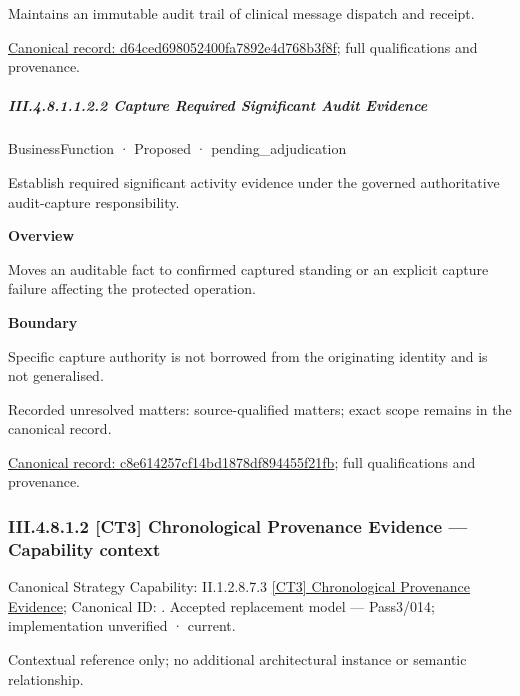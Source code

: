 Maintains an immutable audit trail of clinical message dispatch and receipt.


{\footnotesize \href{../../../../../../../continuum/business/business-function/d64ced698052400fa7892e4d768b3f8f.md}{Canonical record: d64ced698052400fa7892e4d768b3f8f}; full qualifications and provenance.}\par
\subparagraph*{III.4.8.1.1.2.2 Capture Required Significant Audit Evidence}
\label{navigation:III.4.8.1.1.2.2}

\label{element:c8e614257cf14bd1878df894455f21fb}
{\small BusinessFunction · Proposed · pending\_adjudication}\par

Establish required significant activity evidence under the governed authoritative audit-capture responsibility.



\textbf{Overview}



Moves an auditable fact to confirmed captured standing or an explicit capture failure affecting the protected operation.



\textbf{Boundary}



Specific capture authority is not borrowed from the originating identity and is not generalised.


{\small Recorded unresolved matters: source-qualified matters; exact scope remains in the canonical record.}\par
{\footnotesize \href{../../../../../../../continuum/business/business-function/c8e614257cf14bd1878df894455f21fb.md}{Canonical record: c8e614257cf14bd1878df894455f21fb}; full qualifications and provenance.}\par
\subsubsection*{III.4.8.1.2 [CT3] Chronological Provenance Evidence — Capability context}
\label{navigation:III.4.8.1.2}

{\small Canonical Strategy Capability: II.1.2.8.7.3 \hyperref[element:95c06dba5448453992d55106b19f977d]{[CT3] Chronological Provenance Evidence}; Canonical ID: \texttt{}. Accepted replacement model — Pass3/014; implementation unverified · current.}\par
Contextual reference only; no additional architectural instance or semantic relationship.\par
